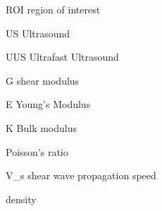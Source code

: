 ROI
region of interest

US
Ultrasound

UUS
Ultrafast Ultrasound




G
shear modulus

E 
Young's Modulus

K 
Bulk modulus

\nu
Poisson's ratio

V_s 
shear wave propagation speed

\rho
density

